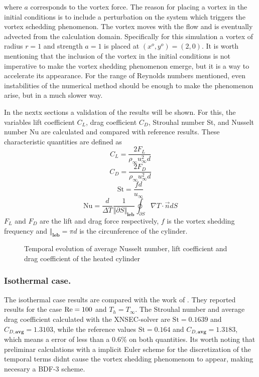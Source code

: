 where $a$ corresponds to the vortex force. The reason for placing a vortex in the initial conditions is to include a perturbation on the system which triggers the vortex schedding phenomenon.  The vortex moves with the flow and is eventually advected from the calculation domain. Specifically for this simulation a vortex of radius $r=1$ and strength $a = 1$ is placed at $(x^o,y^o) = ( 2,0)$. It is  worth mentioning that the inclusion of the vortex in the initial conditions is not imperative to make the vortex shedding phenomenon emerge, but it is a way to accelerate its appearance. For the range of Reynolds numbers mentioned, even instabilities of the numerical method should be enough to make the phenomenon arise, but in a much slower way. 

In the nextx sections a validation of the results will be shown. For this, the variables lift coefficient $C_L$, drag coefficient $C_D$, Strouhal number St, and Nusselt number Nu are calculated and compared with reference results. These characteristic quantities are defined as
\begin{equation} 
	C_L = \frac{2F_L}{\rho_\infty u^2_\infty d}
\end{equation}
\begin{equation}
	C_D = \frac{2F_D}{\rho_\infty u^2_\infty d}
\end{equation}
\begin{equation}
	\text{St} = \frac{fd}{u_\infty}
\end{equation}
\begin{equation}
	\text{Nu} = \frac{d}{\Delta T}\frac{1}{\Vert \partial S\Vert_{\textbf{leb}}}\oint_{\partial S} \nabla T \cdot \vec{n} dS
\end{equation}
$F_L$ and $F_D$ are the lift and drag force respectively, $f$ is the vortex shedding frequency and $\Vert_{\textbf{leb}} = \pi d$ is the circunference of the cylinder.
\begin{figure}[t]
	\centering	
	\caption{Temporal evolution of average Nusselt number, lift coefficient and drag coefficient of the heated cylinder}	\label{fig:HeatedCylinderResults}
\end{figure}
\subsubsection{Isothermal case.}
The isothermal case results are compared with the work of \cite{sharmaHEATFLUIDFLOW2004}. They reported results for the case $\text{Re} = 100$ and $T_h = T_\infty$. The Strouhal number and average drag coefficient calculated with the XNSEC-solver are $\text{St} = 0.1639$ and $C_{D,\textbf{avg}} = 1.3103$, while the reference values $\text{St} = 0.164$ and $C_{D,\textbf{avg}} = 1.3183$, which means a error of less than a 0.6\% on both quantities. Its worth noting that preliminar calculations with a implicit Euler scheme for the discretization of the temporal terms didnt cause the vortex shedding phenomenom to appear, making necesary a BDF-3 scheme.
